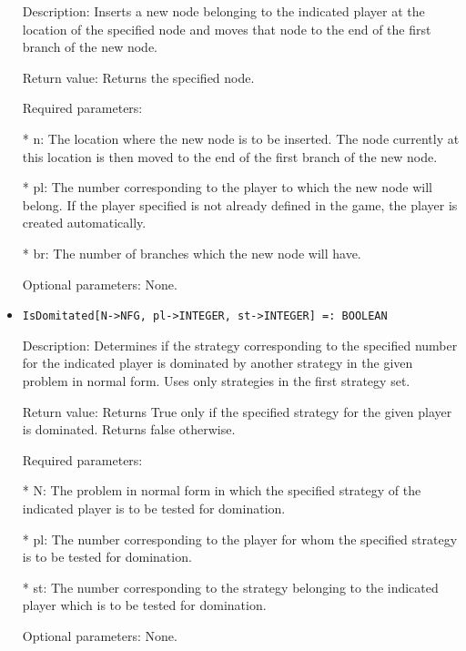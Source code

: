 \begin{itemize}
\bd
\item
[Description:] Inserts a new node belonging to the indicated player at 
the location of the specified node and moves that node to the end of 
the first branch of the new node.
\item
[Return value:] Returns the specified node.
\item
[Required parameters:]\hfil\null

\bd
\item
[* n:] The location where the new node is to be inserted.  The node
currently at this location is then moved to the end of the first
branch of the new node.
\item
[* pl:] The number corresponding to the player to which the new node
will belong.  If the player specified is not already defined in	the
game, the player is created automatically.
\item
[* br:] The number of branches which the new node will have.
\ed

\item
[Optional parameters:] None.
\ed

\item
\begin{verbatim}
IsDomitated[N->NFG, pl->INTEGER, st->INTEGER] =: BOOLEAN
\end{verbatim}

\bd
\item
[Description:] Determines if the strategy corresponding to the specified
number for the indicated player is dominated by another strategy in the
given problem in normal form.  Uses only strategies in the first 
strategy set.
\item
[Return value:] Returns True only if the specified strategy for the 
given player is dominated.  Returns false otherwise.
\item
[Required parameters:]\hfil\null

\bd
\item
[* N:] The problem in normal form in which the specified strategy of
the indicated player is to be tested for domination.
\item
[* pl:] The number corresponding to the player for whom the specified
strategy is to be tested for domination.
\item
[* st:] The number corresponding to the strategy belonging to the 
indicated player which is to be tested for domination.
\ed

\item
[Optional parameters:] None.
\ed


\end{itemize}
